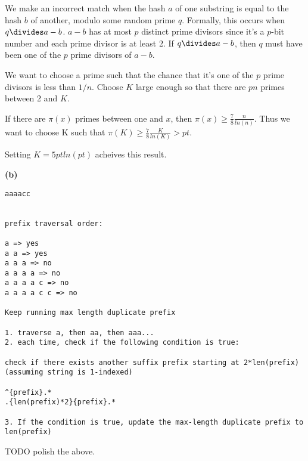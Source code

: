 \documentclass[11pt]{article}
\renewcommand{\part}[1] {\vspace{.10in} {\bf (#1)}}
\begin{document}
We make an incorrect match when the hash $a$ of one substring is equal to the hash $b$ of another, modulo some random prime $q$.
Formally, this occurs when $q \divides a-b$. $a-b$ has at most $p$ distinct prime divisors since it's a $p$-bit number and each prime divisor is at least 2.
If $q \divides a-b$, then $q$ must have been one of the $p$ prime divisors of $a-b$.

We want to choose a prime such that the chance that it's one of the $p$ prime divisors is less than $1/n$.
Choose $K$ large enough so that there are $pn$ primes between 2 and $K$.

If there are $\pi(x)$ primes between one and $x$, then $\pi(x) ≥ \frac{7}{8} \frac{n}{ln(n)}$.
Thus we want to choose K such that
$\pi(K) \geq \frac{7}{8} \frac{K}{ln(K)} > pt$.

Setting $K = 5pt ln(pt)$ acheives this result.




\part{b}

\begin{verbatim}
aaaacc


prefix traversal order:

a => yes
a a => yes
a a a => no
a a a a => no
a a a a c => no
a a a a c c => no

Keep running max length duplicate prefix

1. traverse a, then aa, then aaa...
2. each time, check if the following condition is true:

check if there exists another suffix prefix starting at 2*len(prefix) (assuming string is 1-indexed)

^{prefix}.*
.{len(prefix)*2}{prefix}.*

3. If the condition is true, update the max-length duplicate prefix to len(prefix)

\end{verbatim}

TODO polish the above.
\end{document}
